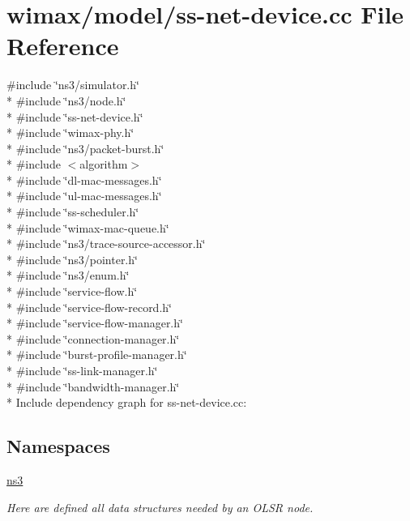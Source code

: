 \hypertarget{ss-net-device_8cc}{}\section{wimax/model/ss-\/net-\/device.cc File Reference}
\label{ss-net-device_8cc}
{\ttfamily \#include \char`\"{}ns3/simulator.\+h\char`\"{}}\\*
{\ttfamily \#include \char`\"{}ns3/node.\+h\char`\"{}}\\*
{\ttfamily \#include \char`\"{}ss-\/net-\/device.\+h\char`\"{}}\\*
{\ttfamily \#include \char`\"{}wimax-\/phy.\+h\char`\"{}}\\*
{\ttfamily \#include \char`\"{}ns3/packet-\/burst.\+h\char`\"{}}\\*
{\ttfamily \#include $<$algorithm$>$}\\*
{\ttfamily \#include \char`\"{}dl-\/mac-\/messages.\+h\char`\"{}}\\*
{\ttfamily \#include \char`\"{}ul-\/mac-\/messages.\+h\char`\"{}}\\*
{\ttfamily \#include \char`\"{}ss-\/scheduler.\+h\char`\"{}}\\*
{\ttfamily \#include \char`\"{}wimax-\/mac-\/queue.\+h\char`\"{}}\\*
{\ttfamily \#include \char`\"{}ns3/trace-\/source-\/accessor.\+h\char`\"{}}\\*
{\ttfamily \#include \char`\"{}ns3/pointer.\+h\char`\"{}}\\*
{\ttfamily \#include \char`\"{}ns3/enum.\+h\char`\"{}}\\*
{\ttfamily \#include \char`\"{}service-\/flow.\+h\char`\"{}}\\*
{\ttfamily \#include \char`\"{}service-\/flow-\/record.\+h\char`\"{}}\\*
{\ttfamily \#include \char`\"{}service-\/flow-\/manager.\+h\char`\"{}}\\*
{\ttfamily \#include \char`\"{}connection-\/manager.\+h\char`\"{}}\\*
{\ttfamily \#include \char`\"{}burst-\/profile-\/manager.\+h\char`\"{}}\\*
{\ttfamily \#include \char`\"{}ss-\/link-\/manager.\+h\char`\"{}}\\*
{\ttfamily \#include \char`\"{}bandwidth-\/manager.\+h\char`\"{}}\\*
Include dependency graph for ss-\/net-\/device.cc\+:
\subsection*{Namespaces}
\begin{DoxyCompactItemize}
\item 
 \hyperlink{namespacens3}{ns3}
\begin{DoxyCompactList}\small\item\em Here are defined all data structures needed by an O\+L\+SR node. \end{DoxyCompactList}\end{DoxyCompactItemize}
